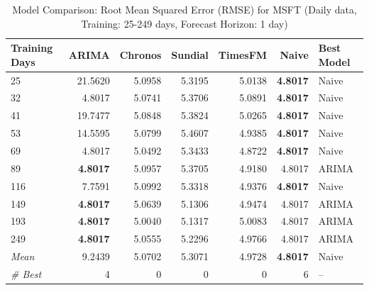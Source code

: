\begin{table}[htbp]
\centering
\caption{Model Comparison: Root Mean Squared Error (RMSE) for MSFT (Daily data, Training: 25-249 days, Forecast Horizon: 1 day)}
\label{tab:comparison_MSFT_1d_train-less-year-log_h1_RMSE}
\small
\begin{tabular}{lrrrrrl}
\toprule
Training Days & ARIMA & Chronos & Sundial & TimesFM & Naive & Best Model \\
\midrule
25 & 21.5620 & 5.0958 & 5.3195 & 5.0138 & \textbf{4.8017} & Naive \\
32 & 4.8017 & 5.0741 & 5.3706 & 5.0891 & \textbf{4.8017} & Naive \\
41 & 19.7477 & 5.0848 & 5.3824 & 5.0265 & \textbf{4.8017} & Naive \\
53 & 14.5595 & 5.0799 & 5.4607 & 4.9385 & \textbf{4.8017} & Naive \\
69 & 4.8017 & 5.0492 & 5.3433 & 4.8722 & \textbf{4.8017} & Naive \\
89 & \textbf{4.8017} & 5.0957 & 5.3705 & 4.9180 & 4.8017 & ARIMA \\
116 & 7.7591 & 5.0992 & 5.3318 & 4.9376 & \textbf{4.8017} & Naive \\
149 & \textbf{4.8017} & 5.0639 & 5.1306 & 4.9474 & 4.8017 & ARIMA \\
193 & \textbf{4.8017} & 5.0040 & 5.1317 & 5.0083 & 4.8017 & ARIMA \\
249 & \textbf{4.8017} & 5.0555 & 5.2296 & 4.9766 & 4.8017 & ARIMA \\
\midrule
\textit{Mean} & 9.2439 & 5.0702 & 5.3071 & 4.9728 & \textbf{4.8017} & Naive \\
\textit{\# Best} & 4 & 0 & 0 & 0 & 6 & -- \\
\bottomrule
\end{tabular}
\end{table}